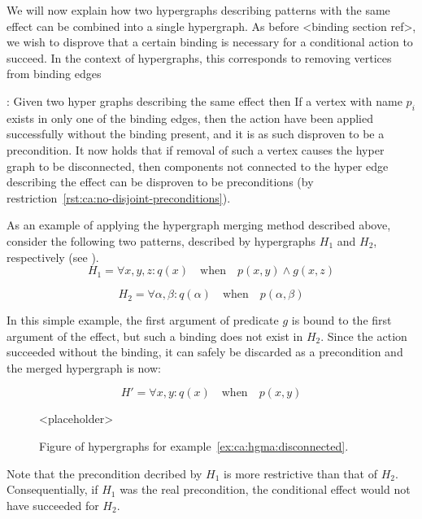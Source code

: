 \documentclass[../Master.tex]{subfiles}
\begin{document}
We will now explain how two hypergraphs describing patterns with the same effect can be combined into a single hypergraph. As before <binding section ref>, we wish to disprove that a certain binding is necessary for a conditional action to succeed. In the context of hypergraphs, this corresponds to removing vertices from binding edges

: Given two hyper graphs describing the same effect then  
If a vertex with name $p_i$ exists in only one of the binding edges, then the action have been applied successfully without the binding present, and it is as such disproven to be a precondition. It now holds that if removal of such a vertex causes the hyper graph to be disconnected, then components not connected to the hyper edge describing the effect can be disproven to be preconditions (by restriction~\ref{rst:ca:no-disjoint-preconditions}).

\begin{example} \label{ex:ca:hgma:disconnected}
	As an example of applying the hypergraph merging method described above, consider the following two patterns, described by hypergraphs $H_1$ and $H_2$, respectively (see ).
    \begin{equation*}
        H_1 = \forall x, y, z : q(x) \quad \text{when} \quad
            p(x,y) \land g(x, z)
    \end{equation*}

    \begin{equation*}
        H_2 = \forall \alpha, \beta : q(\alpha) \quad \text{when} \quad
            p(\alpha, \beta)
    \end{equation*}

	In this simple example, the first argument of predicate $g$ is bound to the first argument of the effect, but such a binding does not exist in $H_2$. Since the action succeeded without the binding, it can safely be discarded as a precondition and the merged hypergraph is now:

    \begin{equation*}
        H' = \forall x, y : q(x) \quad \text{when} \quad p(x, y)
    \end{equation*}

    \begin{figure}
        <placeholder>
        \caption{\label{fig:ex:ca:hgma:ex:disconnected} Figure of hypergraphs for example~\ref{ex:ca:hgma:disconnected}.}
    \end{figure}

    Note that the precondition decribed by $H_1$ is more restrictive than that of $H_2$. Consequentially, if $H_1$ was the real precondition, the conditional effect would not have succeeded for $H_2$.
\end{example}
\end{document}
